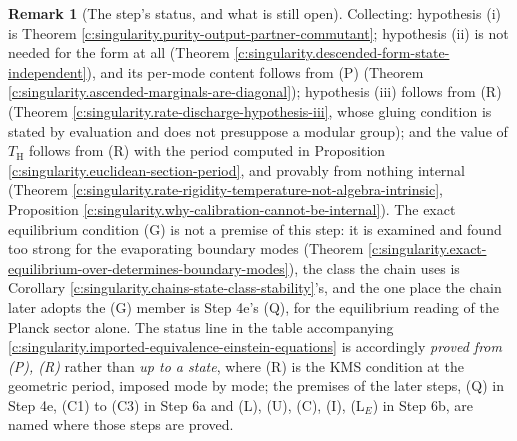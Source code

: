 \documentclass[11pt]{article}
\theoremstyle{definition}
\newtheorem{remark}[theorem]{Remark}
\theoremstyle{plain}
\providecommand{\TH}{}\renewcommand{\TH}{T_{\mathrm{H}}}
\begin{document}
\begin{remark}[The step's status, and what is still open]\label{c:note.singularity.steps-status-what-still-open}
Collecting: hypothesis (i) is Theorem \ref{c:singularity.purity-output-partner-commutant}; hypothesis (ii) is not needed for the form at all (Theorem \ref{c:singularity.descended-form-state-independent}), and its per-mode content follows from (P) (Theorem \ref{c:singularity.ascended-marginals-are-diagonal}); hypothesis (iii) follows from (R) (Theorem \ref{c:singularity.rate-discharge-hypothesis-iii}, whose gluing condition is stated by evaluation and does not presuppose a modular group); and the value of $\TH$ follows from (R) with the period computed in Proposition \ref{c:singularity.euclidean-section-period}, and provably from nothing internal (Theorem \ref{c:singularity.rate-rigidity-temperature-not-algebra-intrinsic}, Proposition \ref{c:singularity.why-calibration-cannot-be-internal}). The exact equilibrium condition (G) is not a premise of this step: it is examined and found too strong for the evaporating boundary modes (Theorem \ref{c:singularity.exact-equilibrium-over-determines-boundary-modes}), the class the chain uses is Corollary \ref{c:singularity.chains-state-class-stability}'s, and the one place the chain later adopts the (G) member is Step 4e's (Q), for the equilibrium reading of the Planck sector alone. The status line in the table accompanying \ref{c:singularity.imported-equivalence-einstein-equations} is accordingly \emph{proved from (P), (R)} rather than \emph{up to a state}, where (R) is the KMS condition at the geometric period, imposed mode by mode; the premises of the later steps, (Q) in Step 4e, (C1) to (C3) in Step 6a and (L), (U), (C), (I), (L$_E$) in Step 6b, are named where those steps are proved.


\end{remark}
\end{document}
